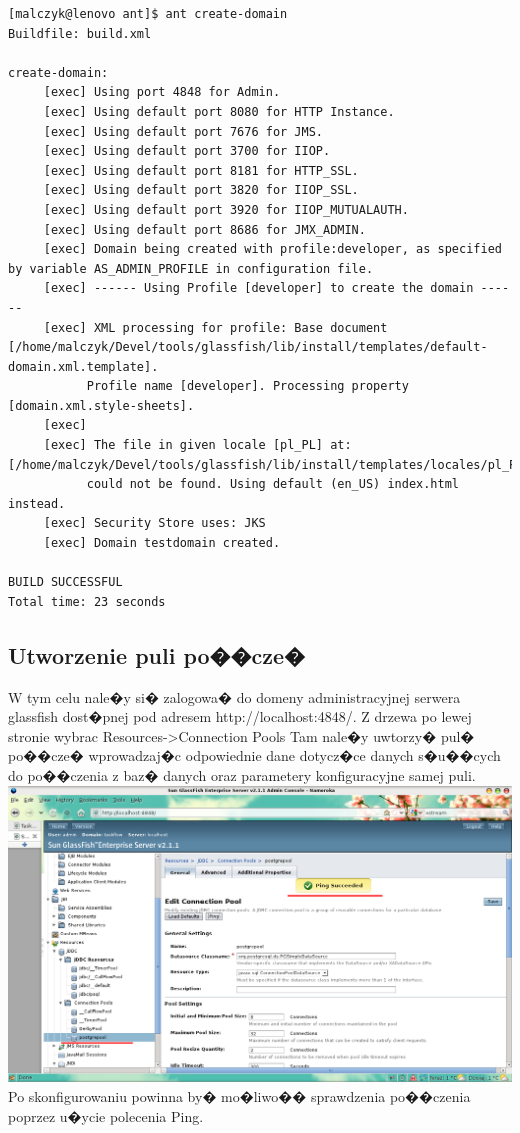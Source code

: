 \documentclass{article}
\begin{document}
{\tiny
\begin{verbatim}
[malczyk@lenovo ant]$ ant create-domain
Buildfile: build.xml

create-domain:
     [exec] Using port 4848 for Admin.
     [exec] Using default port 8080 for HTTP Instance.
     [exec] Using default port 7676 for JMS.
     [exec] Using default port 3700 for IIOP.
     [exec] Using default port 8181 for HTTP_SSL.
     [exec] Using default port 3820 for IIOP_SSL.
     [exec] Using default port 3920 for IIOP_MUTUALAUTH.
     [exec] Using default port 8686 for JMX_ADMIN.
     [exec] Domain being created with profile:developer, as specified by variable AS_ADMIN_PROFILE in configuration file.
     [exec] ------ Using Profile [developer] to create the domain ------
     [exec] XML processing for profile: Base document [/home/malczyk/Devel/tools/glassfish/lib/install/templates/default-domain.xml.template]. 
           Profile name [developer]. Processing property [domain.xml.style-sheets].
     [exec] 
     [exec] The file in given locale [pl_PL] at: [/home/malczyk/Devel/tools/glassfish/lib/install/templates/locales/pl_PL/index.html] 
           could not be found. Using default (en_US) index.html instead.
     [exec] Security Store uses: JKS
     [exec] Domain testdomain created.

BUILD SUCCESSFUL
Total time: 23 seconds
\end{verbatim}
}

\subsection{Utworzenie puli po��cze�}
W tym celu nale�y si� zalogowa� do domeny administracyjnej serwera glassfish dost�pnej pod adresem http://localhost:4848/.
Z drzewa po lewej stronie wybrac Resources->Connection Pools
Tam nale�y uwtorzy� pul� po��cze� wprowadzaj�c odpowiednie dane dotycz�ce danych s�u��cych do po��czenia z baz� danych oraz 
parametery konfiguracyjne samej puli.
\newline
\newline
\includegraphics[scale=0.4]{img/admin00.png}
\newline
\newline
Po skonfigurowaniu powinna by� mo�liwo�� sprawdzenia po��czenia poprzez u�ycie polecenia Ping.
\end{document}
